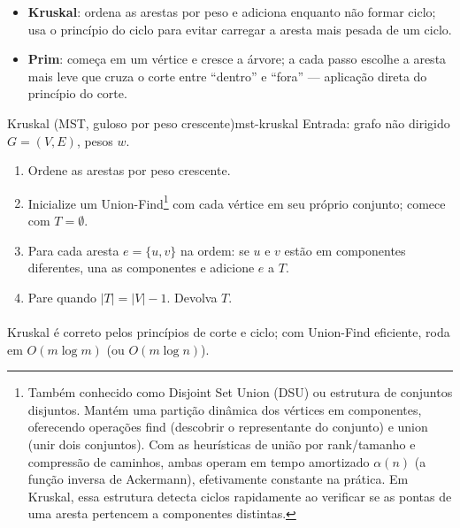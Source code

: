 \documentclass[12pt,a4paper]{article}
\def\texttt#1{#1}%
\def\emph#1{#1}%
\begin{document}
\begin{itemize}\setlength{\itemsep}{2pt}
    \item \textbf{Kruskal}: ordena as arestas por peso e adiciona enquanto não formar ciclo; usa o princípio do ciclo para evitar carregar a aresta mais pesada de um ciclo.
    \item \textbf{Prim}: começa em um vértice e cresce a árvore; a cada passo escolhe a aresta mais leve que cruza o corte entre “dentro” e “fora” — aplicação direta do princípio do corte.
\end{itemize}


\begin{algobox}{Kruskal (MST, guloso por peso crescente)}{mst-kruskal}
    Entrada: grafo não dirigido \(G=(V,E)\), pesos \(w\).
    \begin{enumerate}\setlength{\itemsep}{2pt}
        \item Ordene as arestas por peso crescente.
        \item Inicialize um \emph{Union-Find}\footnote{Também conhecido como \emph{Disjoint Set Union} (DSU) ou \emph{estrutura de conjuntos disjuntos}. Mantém uma partição dinâmica dos vértices em componentes, oferecendo operações \texttt{find} (descobrir o representante do conjunto) e \texttt{union} (unir dois conjuntos). Com as heurísticas de \emph{união por rank/tamanho} e \emph{compressão de caminhos}, ambas operam em tempo amortizado \(\alpha(n)\) (a função inversa de Ackermann), efetivamente constante na prática. Em Kruskal, essa estrutura detecta ciclos rapidamente ao verificar se as pontas de uma aresta pertencem a componentes distintas.} com cada vértice em seu próprio conjunto; comece com \(T=\emptyset\).
        \item Para cada aresta \(e=\{u,v\}\) na ordem: se \(u\) e \(v\) estão em componentes diferentes, una as componentes e adicione \(e\) a \(T\).
        \item Pare quando \(|T|=|V|-1\). Devolva \(T\).
    \end{enumerate}
\end{algobox}

\paragraph{}Kruskal é correto pelos princípios de corte e ciclo; com Union-Find eficiente, roda em \(O(m\log m)\) (ou \(O(m\log n)\)).
\end{document}
